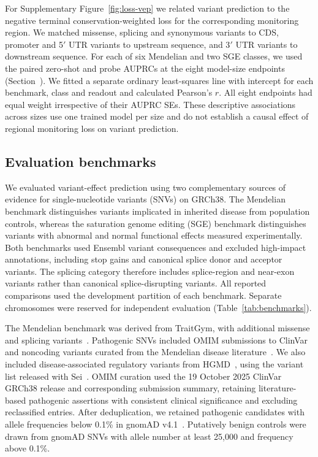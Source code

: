 \documentclass[a4paper,num-refs]{oup-contemporary}
\begin{document}
For Supplementary Figure~\ref{fig:loss-vep} we related variant prediction
to the negative terminal conservation-weighted loss for the corresponding
monitoring region. We matched missense, splicing and synonymous variants
to CDS, promoter and 5$'$ UTR variants to upstream sequence, and
3$'$ UTR variants to downstream sequence. For each of six Mendelian and
two SGE classes, we used the paired zero-shot and probe AUPRCs at the eight
model-size endpoints (Section~). We fitted a
separate ordinary least-squares line with intercept for each benchmark,
class and readout and calculated Pearson's $r$. All eight endpoints had
equal weight irrespective of their AUPRC SEs. These descriptive associations
across sizes use one trained model per size and do not establish a causal
effect of regional monitoring loss on variant prediction.

\subsection{Evaluation benchmarks}\label{methods:benchmarks}

We evaluated variant-effect prediction using two complementary sources
of evidence for single-nucleotide variants (SNVs) on GRCh38.
The Mendelian benchmark distinguishes variants implicated in inherited
disease from population controls, whereas the saturation genome editing
(SGE) benchmark distinguishes variants with abnormal and normal
functional effects measured experimentally.
Both benchmarks used Ensembl variant consequences and excluded
high-impact annotations, including stop gains and canonical splice
donor and acceptor variants. The splicing category therefore includes
splice-region and near-exon variants rather than canonical
splice-disrupting variants.
All reported comparisons used the development partition of each benchmark.
Separate chromosomes were reserved for independent evaluation
(Table~\ref{tab:benchmarks}).

The Mendelian benchmark was derived from TraitGym, with additional
missense and splicing variants~\citep{benegas2025traitgym,mendeliancard}.
Pathogenic SNVs included OMIM submissions to
ClinVar~\citep{amberger2015omim,landrum2020clinvar} and noncoding
variants curated from the Mendelian disease literature~\citep{smedley2016regulatory}.
We also included disease-associated
regulatory variants from HGMD~\citep{stenson2017hgmd},
using the variant list released with Sei~\citep{chen2022sei}.
OMIM curation used the 19 October 2025 ClinVar GRCh38 release and
corresponding submission summary, retaining literature-based
pathogenic assertions with consistent clinical significance and
excluding reclassified entries.
After deduplication, we retained pathogenic candidates with allele
frequencies below 0.1\% in gnomAD v4.1~\citep{chao2024gnomad}.
Putatively benign controls were drawn from gnomAD SNVs with allele
number at least 25,000 and frequency above 0.1\%.
\end{document}
